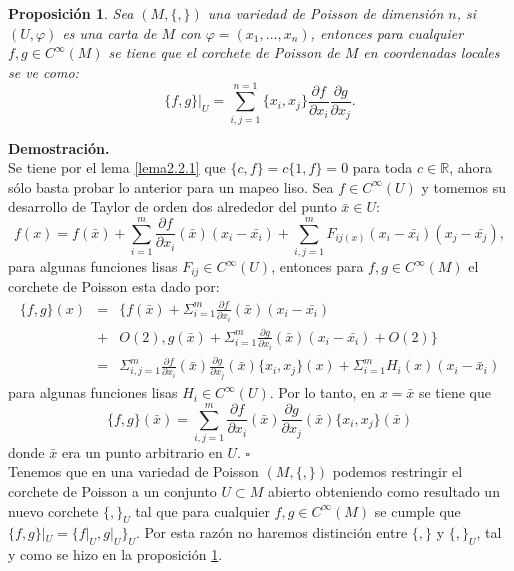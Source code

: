 \documentclass[a4paper,10pt]{book}
\newtheorem{propo}{Proposici\'on}[chapter]
\begin{document}
\begin{propo}\label{propo1}
Sea $(M,\{,\})$ una variedad de Poisson de dimensi\'on $n$, si $(U,\varphi)$ es una carta de $M$ con $\varphi=(x_{1},...,x_{n})$, entonces para cualquier $f,g\in C^{\infty}(M)$ se tiene que el corchete de Poisson de $M$ en coordenadas locales se ve como:
$$\{f,g\}|_{U}=\sum_{i,j=1}^{n=1}\{x_{i},x_{j}\}\frac{\partial f}{\partial x_{i}}\frac{\partial g}{\partial x_{j}}.$$
\end{propo}
{\bfseries Demostraci\'on.}\\
Se tiene por el lema \ref{lema2.2.1} que $\{c,f\}=c\{1,f\}=0$ para toda $c\in\mathbb{R}$, ahora s\'olo basta probar lo anterior para un mapeo liso. Sea $f\in C^{\infty}(U)$ y tomemos su desarrollo de Taylor de orden dos alrededor del punto $\bar{x}\in U$:
$$f(x)=f(\bar{x})+\sum_{i=1}^{m}\frac{\partial f}{\partial x_{i}}(\bar{x})(x_{i}-\bar{x_{i}}) + \sum_{i,j=1}^{m}F_{ij(x)}(x_{i}-\bar{x_{i}})(x_{j}-\bar{x_{j}}),$$
para algunas funciones lisas $F_{ij}\in C^{\infty}(U)$, entonces para $f,g\in C^{\infty}(M)$ el corchete de Poisson esta dado por:
\begin{eqnarray*}
\{f,g\}(x) & = & \{f(\bar{x})+\Sigma_{i=1}^{m} \frac{\partial f}{\partial x_{i}}(\bar{x})(x_{i}-\bar{x_{i}}) \\ 
           & + & O(2), g(\bar{x})+\Sigma_{i=1}^{m} \frac{\partial g}{\partial x_{i}}(\bar{x})(x_{i}-\bar{x_{i}}) + O(2)\} \\
           & = & \Sigma_{i,j=1}^{m}\frac{\partial f}{\partial x_{i}}(\bar{x})\frac{\partial g}{\partial x_{j}} (\bar{x}) \{x_{i},x_{j}\}(x) + \Sigma_{i=1}^{m} H_{i}(x)(x_{i}-\bar{x}_{i})
\end{eqnarray*}
para algunas funciones lisas $H_{i}\in C^{\infty}(U)$. Por lo tanto, en $x=\bar{x}$ se tiene que 
$$\{f,g\}(\bar{x})= \sum_{i,j=1}^{m}\frac{\partial f}{\partial x_{i}}(\bar{x})\frac{\partial g}{\partial x_{j}}(\bar{x})\{x_{i},x_{j}\}(\bar{x})$$ 
donde $\bar{x}$ era un punto arbitrario en $U$. \hfill $\square$\\

Tenemos que en una variedad de Poisson $(M,\{,\})$ podemos restringir el corchete de Poisson a un conjunto $U\subset M$ abierto obteniendo como resultado un nuevo corchete $\{,\}_{U}$ tal que para cualquier $f,g\in C^{\infty}(M)$ se cumple que $\{f,g\}|_{U}=\{f|_{U},g|_{U}\}_{U}$. Por esta raz\'on no haremos distinci\'on entre $\{,\}$ y $\{,\}_{U}$, tal y como se hizo en la proposici\'on \ref{propo1}.\\  
\end{document}
